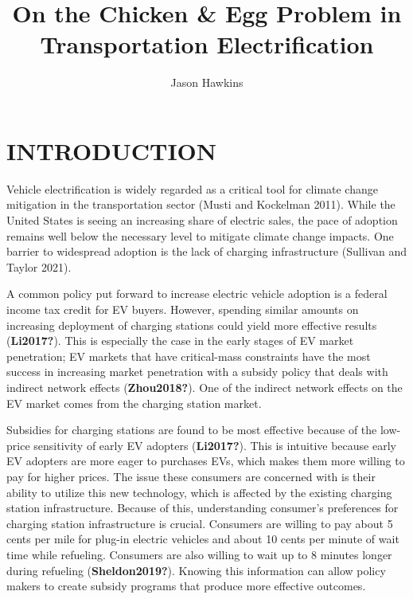 \documentclass[
  letterpaper,
  DIV=11,
  numbers=noendperiod]{scrartcl}
\title{On the Chicken \& Egg Problem in Transportation Electrification}
\author{Jason Hawkins}
\date{}
\begin{document}
\maketitle
\ifdefined\Shaded\renewenvironment{Shaded}{\begin{tcolorbox}[interior hidden, sharp corners, borderline west={3pt}{0pt}{shadecolor}, breakable, enhanced, boxrule=0pt, frame hidden]}{\end{tcolorbox}}\fi

\hypertarget{introduction}{%
\section{INTRODUCTION}\label{introduction}}

Vehicle electrification is widely regarded as a critical tool for
climate change mitigation in the transportation sector (Musti and
Kockelman 2011). While the United States is seeing an increasing share
of electric sales, the pace of adoption remains well below the necessary
level to mitigate climate change impacts. One barrier to widespread
adoption is the lack of charging infrastructure (Sullivan and Taylor
2021).

A common policy put forward to increase electric vehicle adoption is a
federal income tax credit for EV buyers. However, spending similar
amounts on increasing deployment of charging stations could yield more
effective results (\textbf{Li2017?}). This is especially the case in the
early stages of EV market penetration; EV markets that have
critical-mass constraints have the most success in increasing market
penetration with a subsidy policy that deals with indirect network
effects (\textbf{Zhou2018?}). One of the indirect network effects on the
EV market comes from the charging station market.

Subsidies for charging stations are found to be most effective because
of the low-price sensitivity of early EV adopters (\textbf{Li2017?}).
This is intuitive because early EV adopters are more eager to purchases
EVs, which makes them more willing to pay for higher prices. The issue
these consumers are concerned with is their ability to utilize this new
technology, which is affected by the existing charging station
infrastructure. Because of this, understanding consumer's preferences
for charging station infrastructure is crucial. Consumers are willing to
pay about 5 cents per mile for plug-in electric vehicles and about 10
cents per minute of wait time while refueling. Consumers are also
willing to wait up to 8 minutes longer during refueling
(\textbf{Sheldon2019?}). Knowing this information can allow policy
makers to create subsidy programs that produce more effective outcomes.
\end{document}
